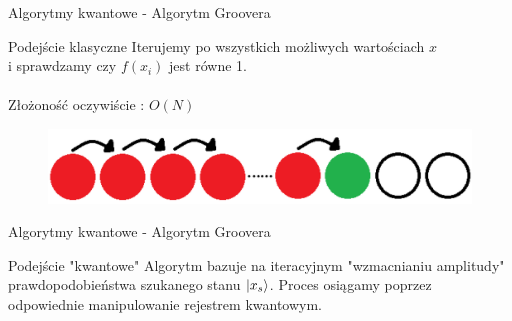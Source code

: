 \documentclass{beamer}
\DeclarePairedDelimiter\ket{\lvert}{\rangle}
\begin{document}
		\begin{frame}{Algorytmy kwantowe - Algorytm Groovera}
		\begin{block}{Podejście klasyczne}
			\vspace{0.5em}
			Iterujemy po wszystkich możliwych wartościach $x$ \\i sprawdzamy czy $f(x_{i})$ jest równe 1.\\~\\
			Złożoność oczywiście : $O(N)$
			\vspace{0.5em}
		\end{block}
		\vspace{0.5em}
		\begin{center}
			\begin{figure}
				\includegraphics[scale=0.25]{media/classicSearch.png}
			\end{figure}
		\end{center}
	\end{frame}

	\begin{frame}{Algorytmy kwantowe - Algorytm Groovera}
		\begin{block}{Podejście "kwantowe"}
			\vspace{0.5em}
			Algorytm bazuje na iteracyjnym "wzmacnianiu amplitudy" prawdopodobieństwa szukanego stanu $\ket{x_s}$.
			Proces osiągamy poprzez odpowiednie manipulowanie rejestrem kwantowym.
			\vspace{0.5em}
		\end{block}
	\end{frame}
\end{document}
